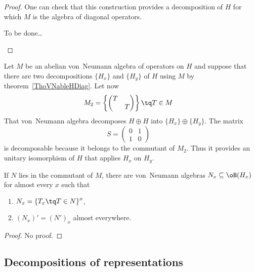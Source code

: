 \begin{proof}
	One can check that this construction provides a decomposition of $H$ for which $M$ is the algebra of diagonal operators.

	\begin{probleme}
	To be done\ldots
	\end{probleme}
\end{proof}

Let $M$ be an abelian von~Neumann algebra of operators on $H$ and suppose that there are two decompositions $\{ H_x \}$ and $\{ H_y \}$ of $H$ using $M$ by theorem~\ref{ThoVNableHDiag}. Let now
\begin{equation}
	M_2=
\left\{
\begin{pmatrix}
  T	&		\\
  	&	T
\end{pmatrix}
 \right\}\tq T\in M
\end{equation}
That von~Neumann algebra decomposes $H\oplus H$ into $\{ H_x \}\oplus\{ H_y \}$. The matrix
\begin{equation}
	S=
\begin{pmatrix}
  0	&	1	\\
  1	&	0
\end{pmatrix}
\end{equation}
is decomposable because it belongs to the commutant of $M_2$. Thus it provides an unitary isomorphism of $H$ that applies $H_x$ on $H_y$.

\begin{proposition}		\label{PropNprimexxNprime}
	If $N$ lies in the commutant of $M$, there are von~Neumann algebras $N_x\subseteq\oB(H_x)$ for almost every $x$ such that
	\begin{enumerate}
		\item $N_x=\{ T_x\tq T\in N \}''$,
		\item $(N_x)'=(N')_x$ almost everywhere.
	\end{enumerate}
\end{proposition}

\begin{proof}
No proof.
\end{proof}

					\subsection{Decompositions of representations}



